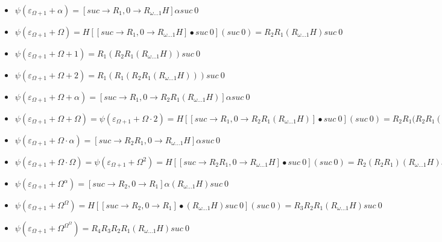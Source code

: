 \documentclass[10pt]{article}
\begin{document}
\begin{itemize}
\item \( \psi(\varepsilon_{\Omega+1}+\alpha) = [suc \rightarrow R_1, 0 \rightarrow R_{\omega \ldots 1} H] \alpha suc\ 0 \)

\item \( \psi(\varepsilon_{\Omega+1}+\Omega) = H [[suc \rightarrow R_1, 0 \rightarrow R_{\omega \ldots 1} H] \bullet suc\ 0] (suc\ 0) = R_2 R_1 (R_{\omega \ldots 1} H) suc\ 0 \)

\item \( \psi(\varepsilon_{\Omega+1}+\Omega+1) = R_1 (R_2 R_1 (R_{\omega \ldots 1} H)) suc\ 0 \)

\item \( \psi(\varepsilon_{\Omega+1}+\Omega+2) = R_1 (R_1 (R_2 R_1 (R_{\omega \ldots 1} H))) suc\ 0 \)

\item \( \psi(\varepsilon_{\Omega+1}+\Omega+\alpha) = [suc \rightarrow R_1, 0 \rightarrow R_2 R_1 (R_{\omega \ldots 1} H)] \alpha suc\ 0 \)

\item \( \psi(\varepsilon_{\Omega+1}+\Omega+\Omega) = \psi(\varepsilon_{\Omega+1}+\Omega \cdot 2) = H [[suc \rightarrow R_1, 0 \rightarrow R_2 R_1 (R_{\omega \ldots 1} H)] \bullet suc\ 0] (suc\ 0) = R_2 R_1 (R_2 R_1 (R_{\omega \ldots 1} H) suc\ 0 \)

\item \( \psi(\varepsilon_{\Omega+1}+\Omega \cdot \alpha) = [suc \rightarrow R_2 R_1, 0 \rightarrow R_{\omega \ldots 1} H] \alpha suc\ 0 \) 

\item \( \psi(\varepsilon_{\Omega+1}+\Omega \cdot \Omega) = \psi(\varepsilon_{\Omega+1}+\Omega^2) = H [[suc \rightarrow R_2 R_1, 0 \rightarrow R_{\omega \ldots 1} H] \bullet suc\ 0] (suc\ 0) = R_2 (R_2 R_1) (R_{\omega \ldots 1} H) suc\ 0 \) 

\item \( \psi(\varepsilon_{\Omega+1}+\Omega^\alpha) = [suc \rightarrow R_2, 0 \rightarrow R_1] \alpha (R_{\omega \ldots 1} H) suc\ 0 \)

\item \( \psi(\varepsilon_{\Omega+1}+\Omega^\Omega) = H [[suc \rightarrow R_2, 0 \rightarrow R_1] \bullet (R_{\omega \ldots 1} H) suc\ 0] (suc\ 0) = R_3 R_2 R_1 (R_{\omega \ldots 1} H) suc\ 0 \)

\item \( \psi(\varepsilon_{\Omega+1}+\Omega^{\Omega^\Omega}) = R_4 R_3 R_2 R_1 (R_{\omega \ldots 1} H) suc\ 0 \)


\end{itemize}
\end{document}

